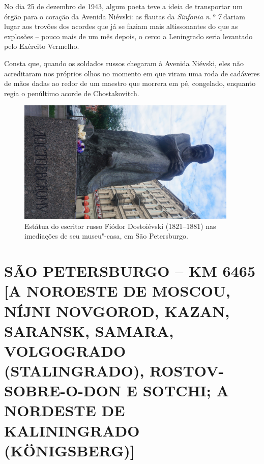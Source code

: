 No dia 25 de dezembro de 1943, algum poeta teve a ideia de transportar
um órgão para o coração da Avenida Niévski: as flautas da \emph{Sinfonia
n.º 7} dariam lugar aos trovões dos acordes que já se faziam mais
altissonantes do que as explosões -- pouco mais de um mês depois, o
cerco a Leningrado seria levantado pelo Exército Vermelho.

Consta que, quando os soldados russos chegaram à Avenida Niévski, eles
não acreditaram nos próprios olhos no momento em que viram uma roda de
cadáveres de mãos dadas ao redor de um maestro que morrera em pé,
congelado, enquanto regia o penúltimo acorde de Chostakovitch.

\pagebreak
\clearpage
\thispagestyle{empty}

\movetoevenpage
\begin{absolutelynopagebreak}
\begin{vplace}
\begin{figure}[H]
\begin{adjustwidth}{-2.7cm}{}
  \vspace{-2.8cm}
  \hspace{2.2cm}
  \includegraphics[width=105mm]{./imgs/petersburgo1.jpg}  
\end{adjustwidth}
  \caption{Estátua do escritor russo Fiódor Dostoiévski (1821--1881) nas imediações de seu museu"-casa, em São Petersburgo.}

\thispagestyle{empty}

\end{figure}
\end{vplace}

\end{absolutelynopagebreak}

\clearpage{\pagestyle{empty}\cleardoublepage}
\movetooddpage
{}
\part*{SÃO PETERSBURGO -- KM 6465\\{[}A NOROESTE DE MOSCOU, NÍJNI NOVGOROD, KAZAN, SARANSK, SAMARA,
VOLGOGRADO (STALINGRADO), ROSTOV-SOBRE-O-DON E SOTCHI; A NORDESTE DE KALININGRADO (KÖNIGSBERG){]}}



